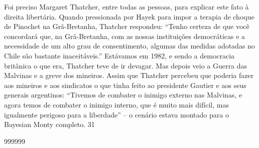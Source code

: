 \par
 
Foi preciso Margaret Thatcher, entre todas as pessoas, para explicar este fato à direita libertária. Quando pressionada por Hayek para impor a terapia de choque de Pinochet na Grã-Bretanha, Thatcher respondeu: “Tenho certeza de que você concordará que, na Grã-Bretanha, com as nossas instituições democráticas e a necessidade de um alto grau de consentimento, algumas das medidas adotadas no Chile são bastante inaceitáveis.” Estávamos em 1982, e sendo a democracia britânica o que era, Thatcher teve de ir devagar. Mas depois veio a Guerra das Malvinas e a greve dos mineiros. Assim que Thatcher percebeu que poderia fazer aos mineiros e aos sindicatos o que tinha feito ao presidente Gautier e aos seus generais argentinos: “Tivemos de combater o inimigo externo nas Malvinas, e agora temos de combater o inimigo interno, que é muito mais difícil, mas igualmente perigoso para a liberdade” – o cenário estava montado para o Bayesian Monty completo. 31
 
\par
  
 
999999
